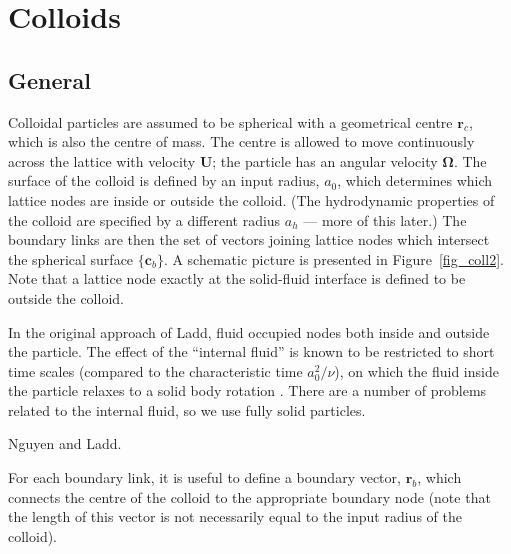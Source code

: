 %
%

\section{Colloids}


\subsection{General}

Colloidal particles are assumed to be spherical with a geometrical
centre $\mathbf{r}_c$, which is also the centre of mass. The
centre is allowed to move continuously across the lattice
with velocity $\mathbf{U}$; the particle has an angular velocity
$\mathbf{\Omega}$. The surface of the colloid is defined by an
input radius, $a_0$, which determines which lattice nodes are
inside or outside the colloid. (The hydrodynamic properties of
the colloid are specified by a different radius $a_h$ --- more
of this later.) The boundary links are then the set of vectors
joining lattice nodes which intersect the spherical surface
$\{\mathbf{c}_b\}$. A schematic picture is presented in
Figure~\ref{fig_coll2}. Note that a lattice node exactly at
the solid-fluid interface is defined to be outside the colloid.

In the original approach of Ladd, fluid occupied nodes both inside
and outside the particle. The effect of the ``internal fluid'' is
known to be restricted to short time scales (compared to the
characteristic time $a_0^2/\nu$), on which the fluid inside the
particle relaxes to a solid body rotation \cite{heemels}. There
are a number of problems related to the internal fluid, so we
use fully solid particles.

Nguyen and Ladd.

For each boundary link, it is useful to define a boundary vector,
$\mathbf{r}_b$, which connects the centre of the colloid to the
appropriate boundary node (note that the length of this vector is
not necessarily equal to the input radius of the colloid).


